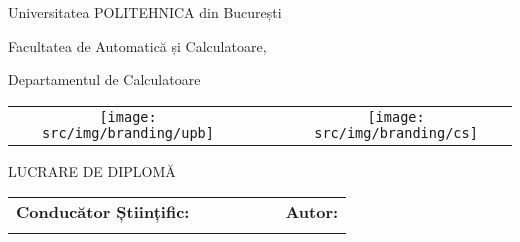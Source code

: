 \begin{titlepage}
	\begin{center}
		{\Large Universitatea POLITEHNICA din București}
		\par\vspace*{2mm}
		{\Large Facultatea de Automatică și Calculatoare,
		
		 Departamentul de Calculatoare}
		\par\vspace*{3mm}
		\begin{table*}[h]
        	\begin{center}
				\begin{tabular}{cccc}
                    \texttt{[image: src/img/branding/upb]}
					& & &
					\texttt{[image: src/img/branding/cs]}
            	\end{tabular}
			\end{center}
		\end{table*}
		
		\par\vspace*{35mm}
		{\Huge LUCRARE DE DIPLOMĂ}
		\par\vspace*{15mm}
		{\Huge \VARtitlero}
		\par\vspace*{35mm}
		\begin{table*}[h]
        	\begin{center}
				\begin{tabular}{lcccccl}
					\Large \textbf{\Large Conducător Științific:}
					\vspace*{1mm} &&&&&& \Large \textbf{\Large Autor:}\vspace*{1mm} \\
					\Large \VARadviser &&&&&& \Large \VARauthor
				\end{tabular}
			\end{center}
		\end{table*}

		\par\vspace*{37mm}
		\Large \VARtitlefooterro
	\end{center}
\end{titlepage}
